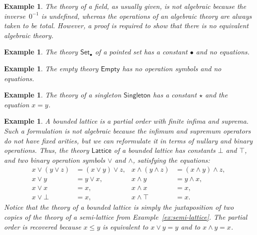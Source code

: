 \documentclass{amsart}
\newcommand{\theory}[1]{\mathsf{#1}} %
\newtheorem{example}[definition]{Example}
\begin{document}
\begin{example}
  \label{ex:field}
  The theory of a field, as usually given, is not algebraic because the inverse~$0^{-1}$
  is undefined, whereas the operations of an algebraic theory are always taken to be
  total. However, a proof is required to show that there is no equivalent algebraic theory.
\end{example}

\begin{example}
  \label{ex:pointed-set}
  The theory $\theory{Set_\bullet}$ of a \emph{pointed set} has a constant $\bullet$ and
  no equations.
\end{example}

\begin{example}
  \label{ex:theory-empty}
  The \emph{empty theory $\theory{Empty}$} has no operation symbols and no equations.
\end{example}

\begin{example}
  \label{ex:theory-singleton}
  The theory of a \emph{singleton $\theory{Singleton}$} has a constant $\star$ and the
  equation $x = y$.
\end{example}

\begin{example}
  \label{ex:lattice}
  A bounded lattice is a partial order with finite infima and suprema. Such a formulation
  is not algebraic because the infimum and supremum operators do not have fixed arities,
  but we can reformulate it in terms of nullary and binary operations. Thus, the theory
  $\theory{Lattice}$ of a bounded lattice has constants $\bot$ and $\top$, and two binary
  operation symbols $\vee$ and $\wedge$, satisfying the equations:
  \begin{align*}
    x \vee (y \vee z) &= (x \vee y) \vee z,   &      x \wedge (y \wedge z) &= (x \wedge y) \wedge z,\\
    x \vee y &= y \vee x,                     &      x \wedge y &= y \wedge x,\\
    x \vee x &= x,                            &      x \wedge x &= x,\\
    x \vee \bot &= x,                         &      x \wedge \top &= x.
  \end{align*}
  Notice that the theory of a bounded lattice is simply the juxtaposition of two copies of
  the theory of a semi-lattice from Example~\ref{ex:semi-lattice}. The partial order is
  recovered because $x \leq y$ is equivalent to $x \vee y = y$ and to $x \wedge y = x$.
\end{example}
\end{document}
